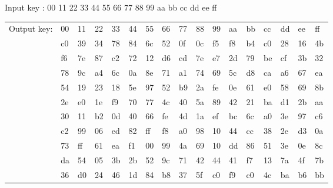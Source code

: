 \begin{small}
  Input key : 00 11 22 33 44 55 66 77 88 99 aa bb cc dd ee ff 

  \begin{longtable}{l l l l l l l l l l l l l l l l l}
    Output key: & 00 & 11 & 22 & 33 & 44 & 55 & 66 & 77 & 88 & 99 & aa & bb & cc & dd & ee & ff  \\
    & c0 & 39 & 34 & 78 & 84 & 6c & 52 & 0f & 0c & f5 & f8 & b4 & c0 & 28 & 16 & 4b \\
    & f6 & 7e & 87 & c2 & 72 & 12 & d6 & cd & 7e & e7 & 2d & 79 & be & cf & 3b & 32 \\
    & 78 & 9c & a4 & 6c & 0a & 8e & 71 & a1 & 74 & 69 & 5c & d8 & ca & a6 & 67 & ea \\
    & 54 & 19 & 23 & 18 & 5e & 97 & 52 & b9 & 2a & fe & 0e & 61 & e0 & 58 & 69 & 8b \\
    & 2e & e0 & 1e & f9 & 70 & 77 & 4c & 40 & 5a & 89 & 42 & 21 & ba & d1 & 2b & aa \\
    & 30 & 11 & b2 & 0d & 40 & 66 & fe & 4d & 1a & ef & bc & 6c & a0 & 3e & 97 & c6 \\
    & c2 & 99 & 06 & ed & 82 & ff & f8 & a0 & 98 & 10 & 44 & cc & 38 & 2e & d3 & 0a \\
    & 73 & ff & 61 & ea & f1 & 00 & 99 & 4a & 69 & 10 & dd & 86 & 51 & 3e & 0e & 8c \\
    & da & 54 & 05 & 3b & 2b & 52 & 9c & 71 & 42 & 44 & 41 & f7 & 13 & 7a & 4f & 7b \\
    & 36 & d0 & 24 & 46 & 1d & 84 & b8 & 37 & 5f & c0 & f9 & c0 & 4c & ba & b6 & bb \\
  \end{longtable}
\end{small}

